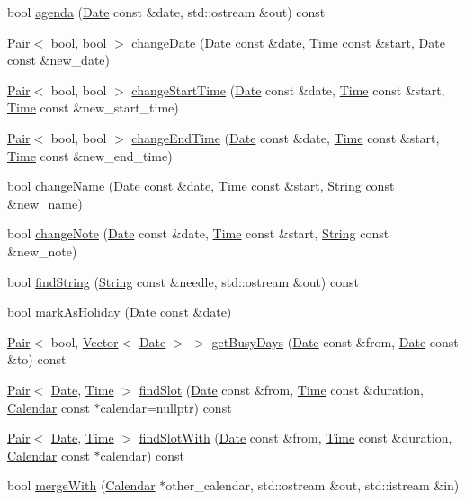 \begin{DoxyCompactItemize}
bool \hyperlink{classProgram_a36916661bfce488ed07dbc2a7f3fadce}{agenda} (\hyperlink{classDate}{Date} const \&date, std\+::ostream \&out) const
\item 
\hyperlink{structPair}{Pair}$<$ bool, bool $>$ \hyperlink{classProgram_a4a25f61fe0747f0f13ace13b310ed7a3}{change\+Date} (\hyperlink{classDate}{Date} const \&date, \hyperlink{classTime}{Time} const \&start, \hyperlink{classDate}{Date} const \&new\+\_\+date)
\item 
\hyperlink{structPair}{Pair}$<$ bool, bool $>$ \hyperlink{classProgram_afb92c7d470233331feb450698ea66531}{change\+Start\+Time} (\hyperlink{classDate}{Date} const \&date, \hyperlink{classTime}{Time} const \&start, \hyperlink{classTime}{Time} const \&new\+\_\+start\+\_\+time)
\item 
\hyperlink{structPair}{Pair}$<$ bool, bool $>$ \hyperlink{classProgram_a8038bf54fd0e358c48d02ced033b6848}{change\+End\+Time} (\hyperlink{classDate}{Date} const \&date, \hyperlink{classTime}{Time} const \&start, \hyperlink{classTime}{Time} const \&new\+\_\+end\+\_\+time)
\item 
bool \hyperlink{classProgram_a606ccb02438885b2894843613d6de157}{change\+Name} (\hyperlink{classDate}{Date} const \&date, \hyperlink{classTime}{Time} const \&start, \hyperlink{classString}{String} const \&new\+\_\+name)
\item 
bool \hyperlink{classProgram_a63f49d8259cb4038274a1cb6e9b82374}{change\+Note} (\hyperlink{classDate}{Date} const \&date, \hyperlink{classTime}{Time} const \&start, \hyperlink{classString}{String} const \&new\+\_\+note)
\item 
bool \hyperlink{classProgram_af80c02ad4f189ee0d6c67ccc7efdc814}{find\+String} (\hyperlink{classString}{String} const \&needle, std\+::ostream \&out) const
\item 
bool \hyperlink{classProgram_ad14086e73ec4aef58c705e3a19089d97}{mark\+As\+Holiday} (\hyperlink{classDate}{Date} const \&date)
\item 
\hyperlink{structPair}{Pair}$<$ bool, \hyperlink{classVector}{Vector}$<$ \hyperlink{classDate}{Date} $>$ $>$ \hyperlink{classProgram_af91512a81cffe079b6c300f47df906e8}{get\+Busy\+Days} (\hyperlink{classDate}{Date} const \&from, \hyperlink{classDate}{Date} const \&to) const
\item 
\hyperlink{structPair}{Pair}$<$ \hyperlink{classDate}{Date}, \hyperlink{classTime}{Time} $>$ \hyperlink{classProgram_a639a0af6603bda2f6dc8ec051fd1dd93}{find\+Slot} (\hyperlink{classDate}{Date} const \&from, \hyperlink{classTime}{Time} const \&duration, \hyperlink{classCalendar}{Calendar} const $\ast$calendar=nullptr) const
\item 
\hyperlink{structPair}{Pair}$<$ \hyperlink{classDate}{Date}, \hyperlink{classTime}{Time} $>$ \hyperlink{classProgram_aa2159591c5711c2846c261cd672643d6}{find\+Slot\+With} (\hyperlink{classDate}{Date} const \&from, \hyperlink{classTime}{Time} const \&duration, \hyperlink{classCalendar}{Calendar} const $\ast$calendar) const
\item 
bool \hyperlink{classProgram_aea58a5865e12fbbb2dda1563e66d092a}{merge\+With} (\hyperlink{classCalendar}{Calendar} $\ast$other\+\_\+calendar, std\+::ostream \&out, std\+::istream \&in)
\end{DoxyCompactItemize}
